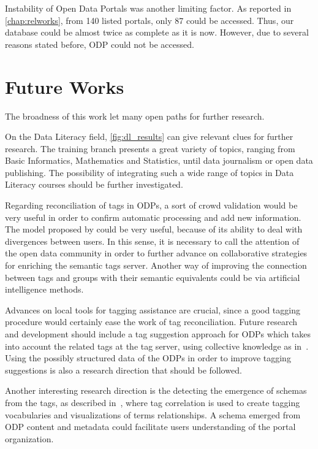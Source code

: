 Instability of Open Data Portals was another limiting factor.
As reported in \autoref{chap:relworks}, from 140 listed portals, only 87 could be accessed.
Thus, our database could be almost twice as complete as it is now.
However, due to several reasons stated before, ODP could not be accessed.

\section{Future Works}

The broadness of this work let many open paths for further research.

On the Data Literacy field, \autoref{fig:dl_results} can give relevant clues for further research.
The training branch presents a great variety of topics, ranging from Basic Informatics, Mathematics and Statistics, until data journalism or open data publishing.
The possibility of integrating such a wide range of topics in Data Literacy courses should be further investigated.

Regarding reconciliation of tags in ODPs, a sort of crowd validation would be very useful in order to confirm automatic processing and add new information.
The model proposed by  could be very useful, because of its ability to deal with divergences between users.
In this sense, it is necessary to call the attention of the open data community in order to further advance on collaborative strategies for enriching the semantic tags server.
Another way of improving the connection between tags and groups with their semantic equivalents could be via artificial intelligence methods. 

Advances on local tools for tagging assistance are crucial, since a good tagging procedure would certainly ease the work of tag reconciliation. 
Future research and development should include a tag suggestion approach for ODPs which takes into account the related tags at the tag server, using collective knowledge as in~.
Using the possibly structured data of the ODPs in order to improve tagging suggestions is also a research direction that should be followed.

Another interesting research direction is the detecting the emergence of schemas from the tags, as described in~, where tag correlation is used to create tagging vocabularies and visualizations of terms relationships.
A schema emerged from ODP content and metadata could facilitate users understanding of the portal organization.

